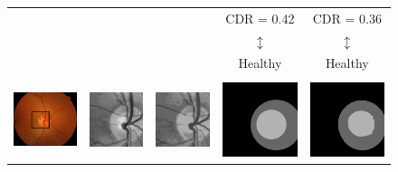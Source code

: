 \begin{figure}[!htbp]
\begin{tabular}{|c c c c c|}
{} & {} & {} & CDR = 0.42 & CDR = 0.36 \\
{} & {} & {} & $\updownarrow$ & $\updownarrow$ \\
{} & {} & {} & Healthy & Healthy \\

\hline

{} & {} & {} & {} & {} \\

\includegraphics[width=3.5cm]{Images/Results/Results/drishti42/od_detect_frame.png} &
\includegraphics[width=3cm]{Images/Results/Results/drishti42/0_crop.png} & 
\includegraphics[width=3.0cm]{Images/Results/Results/drishti42/1_kmeans.png} &
\includegraphics[width=3cm]{Images/Results/Results/drishti42/overlay.png} &
\includegraphics[width=3cm]{Images/Results/Results/drishti42/overlay_gt.png} \\


\end{tabular}
\end{figure}
